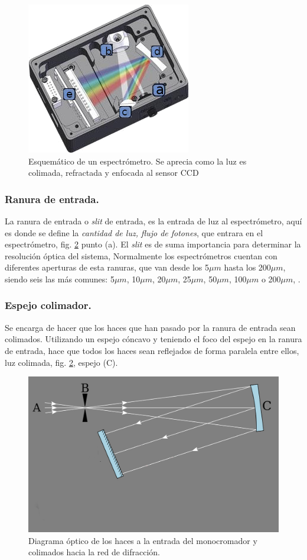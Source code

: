 \begin{figure}[h]
	\centering
	\includegraphics[width=0.55\linewidth]{Imagenes/Espectrometro}
	\caption[Esquema de un espectrómetro.]{Esquemático de un espectrómetro. Se aprecia como la luz es colimada, refractada y enfocada al sensor CCD \cite{BWTEK}}
	\label{fig:esquematicoespectrometro}
\end{figure}

\subsubsection{Ranura de entrada.}
La ranura de entrada o \textit{slit} de entrada, es la entrada de luz al espectrómetro, aquí es donde se define la \textit{cantidad de luz, flujo de fotones}, que entrara en el espectrómetro, fig. \ref{fig:colimarluz} punto (a).
El \textit{slit} es de suma importancia para determinar la resolución óptica del sistema, Normalmente los espectrómetros cuentan con diferentes aperturas de esta ranuras, que van desde los 5$\mu m$ hasta los 200$\mu m$, siendo seis las más comunes: 5$\mu m$, 10$\mu m$, 20$\mu m$, 25$\mu m$, 50$\mu m$, 100$\mu m$ o 200$\mu m$, \cite{Oceana}.

\subsubsection{Espejo colimador.}
Se encarga de hacer que los haces que han pasado por la ranura de entrada sean colimados. Utilizando un espejo cóncavo y teniendo el foco del espejo en la ranura de entrada, hace que todos los haces sean reflejados de forma paralela entre ellos, luz colimada, fig. \ref{fig:colimarluz}, espejo (C). 

\begin{figure}[h]
	\centering
	\includegraphics[width=0.6\linewidth]{Imagenes/ColimarLuz}
	\caption{Diagrama óptico de los haces a la entrada del monocromador y colimados hacia la red de difracción. \cite{Czerny-Turney-Conf}}
	\label{fig:colimarluz}
\end{figure}

